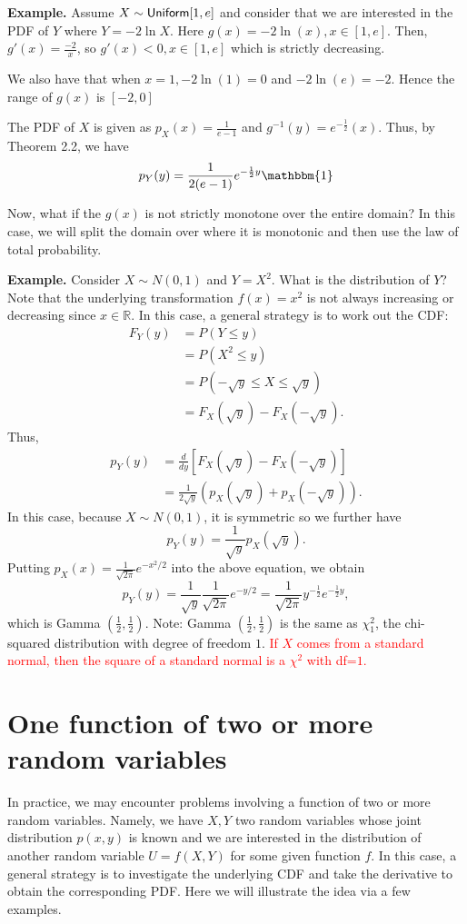 \documentclass[twoside]{article}
\newcommand{\note}[1]{\textcolor{red}{#1}}
\begin{document}
{\bf Example.}
Assume $X\sim {\sf Uniform}[1,e]$ and consider that we are interested in the PDF of $Y$ where $Y=-2\ln X$. Here $g(x)=-2\ln(x), x\in [1,e]$. Then, $g'(x)=\frac{-2}{x}$, so $g'(x)<0, x\in [1,e]$ which is strictly decreasing.

We also have that when $x=1,-2\ln(1)=0$ and $-2\ln(e)=-2$. Hence the range of $g(x)$ is $[-2,0]$

The PDF of $X$ is given as $p_X(x)=\frac{1}{e-1}$ and $g^{-1}(y)=e^{-\frac{1}{2}}(x)$. Thus, by Theorem 2.2, we have
$$
p_Y(y)=\frac{1}{2(e-1)}e^{-\frac{1}{2}y}\mathbbm{1}
$$

Now, what if the $g(x)$ is not strictly monotone over the entire domain? In this case, we will split the domain over where it is monotonic and then use the law of total probability. 

{\bf Example.}
Consider $X\sim N(0,1)$ and $Y =  X^2$.
What is the distribution of $Y$?
Note that the underlying transformation $f(x) =x^2$ 
is not always increasing or decreasing since $x\in\mathbb{R}$.
In this case, a general strategy is to work out the CDF:
\begin{align*}
F_Y(y) &= P(Y\leq y)\\
& = P(X^2\leq y) \\
& = P(-\sqrt{y}\leq X\leq \sqrt{y})\\
&  = F_X(\sqrt{y})-F_X(-\sqrt{y}).
\end{align*}
Thus,
\begin{align*}
p_Y(y) &= \frac{d}{dy}[F_X(\sqrt{y})-F_X(-\sqrt{y})]\\
& = \frac{1}{2\sqrt{y}}(p_X(\sqrt{y}) + p_X(-\sqrt{y})).
\end{align*}
In this case, because $X\sim N(0,1)$, it is symmetric so we further have 
$$
p_Y(y) = \frac{1}{\sqrt{y}}p_X(\sqrt{y}).
$$
Putting $p_X(x) = \frac{1}{\sqrt{2\pi}}e^{-x^2/2}$ into the above equation, we obtain
$$
p_Y(y) = \frac{1}{\sqrt{y}}\frac{1}{\sqrt{2\pi}}e^{-y/2} = \frac{1}{\sqrt{2\pi}}y^{-\frac{1}{2}}e^{-\frac{1}{2}y},
$$
which is Gamma $(\frac{1}{2},\frac{1}{2})$.
Note: Gamma $(\frac{1}{2},\frac{1}{2})$ is the same as $\chi^2_1$, the chi-squared distribution with degree of freedom $1$. 
\note{If $X$ comes from a standard normal, then the square of a standard normal is a $\chi^2$ with df=$1$.}
\section{One function of two or more random variables}

In practice, we may encounter problems involving a function of two or more random variables. 
Namely, we have $X,Y$ two random variables whose joint distribution $p(x,y)$ is known
and we are interested in the distribution of another random variable $U = f(X,Y)$ for some given function $f$.
In this case, a general strategy is to investigate the underlying CDF and take the derivative to obtain the corresponding PDF. 
Here we will illustrate the idea via a few examples. 
\end{document}
